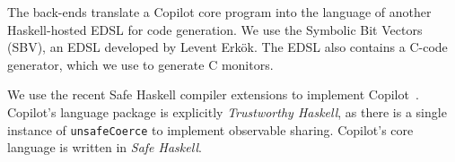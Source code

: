The back-ends translate a Copilot core program into the language of another
Haskell-hosted EDSL for code generation.  We use the
Symbolic Bit Vectors (SBV),  an EDSL
developed by Levent Erk\"{o}k. 
The EDSL also contains a C-code generator, which we use to generate C
monitors. 

We use the recent Safe Haskell compiler extensions to implement
Copilot~\cite{safe}.  Copilot's language package is explicitly \emph{Trustworthy
  Haskell}, as there is a single instance of {\tt unsafeCoerce} to implement
observable sharing.  Copilot's core language is written in \emph{Safe Haskell}.



